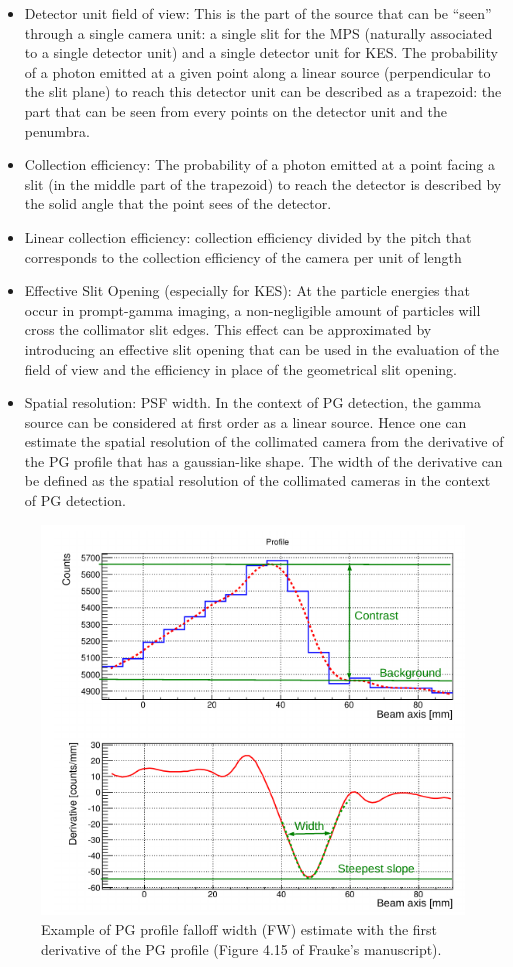 \documentclass[a4paper,english]{article}
\begin{document}
\begin{itemize}
  \item Detector unit field of view: This is the part of the source that can be “seen” through a single camera unit: a single slit for the MPS (naturally associated to a single detector unit) and a single detector unit for KES. The probability of a photon emitted at a given point along a linear source (perpendicular to the slit plane) to reach this detector unit can be described as a trapezoid: the part that can be seen from every points on the detector unit and the penumbra.
  \item Collection efficiency: The probability of a photon emitted at a point facing a slit (in the middle part of the trapezoid) to reach the detector is described by the solid angle that the point sees of the detector.
  \item Linear collection efficiency: collection efficiency divided by the pitch that corresponds to the collection efficiency of the camera per unit of length
  \item Effective Slit Opening (especially for KES): At the particle energies that occur in prompt-gamma imaging, a non-negligible amount of particles will cross the collimator slit edges. This effect can be approximated by introducing an effective slit opening that can be used in the evaluation of the field of view and the efficiency in place of the geometrical slit opening. 
  \item Spatial resolution: PSF width. In the context of PG detection, the gamma source can be considered at first order as a linear source. Hence one can estimate the spatial resolution of the collimated camera from the derivative of the PG profile that has a gaussian-like shape. The width of the derivative can be defined as the spatial resolution of the collimated cameras in the context of PG detection.
\end{itemize}

\begin{figure}[htp]
    \centering
    \includegraphics[width=.45\textwidth]{PGprofile_FW}
    \caption{\label{PGprofile_FW}Example of PG profile falloff width (FW) estimate with the first derivative of the PG profile (Figure 4.15 of Frauke's manuscript).}
\end{figure}          
\end{document}
